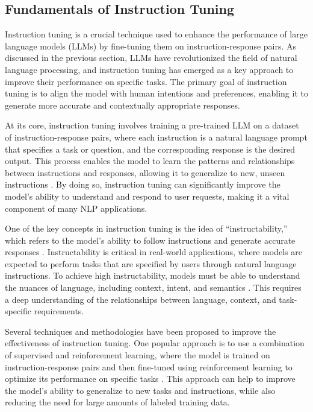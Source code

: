 \documentclass[11pt]{article}
\begin{document}
\subsection{Fundamentals of Instruction Tuning}

Instruction tuning is a crucial technique used to enhance the performance of large language models (LLMs) by fine-tuning them on instruction-response pairs. As discussed in the previous section, LLMs have revolutionized the field of natural language processing, and instruction tuning has emerged as a key approach to improve their performance on specific tasks. The primary goal of instruction tuning is to align the model with human intentions and preferences, enabling it to generate more accurate and contextually appropriate responses.

At its core, instruction tuning involves training a pre-trained LLM on a dataset of instruction-response pairs, where each instruction is a natural language prompt that specifies a task or question, and the corresponding response is the desired output. This process enables the model to learn the patterns and relationships between instructions and responses, allowing it to generalize to new, unseen instructions \cite{ref24}. By doing so, instruction tuning can significantly improve the model's ability to understand and respond to user requests, making it a vital component of many NLP applications.

One of the key concepts in instruction tuning is the idea of ``instructability,'' which refers to the model's ability to follow instructions and generate accurate responses \cite{ref5}. Instructability is critical in real-world applications, where models are expected to perform tasks that are specified by users through natural language instructions. To achieve high instructability, models must be able to understand the nuances of language, including context, intent, and semantics \cite{ref2}. This requires a deep understanding of the relationships between language, context, and task-specific requirements.

Several techniques and methodologies have been proposed to improve the effectiveness of instruction tuning. One popular approach is to use a combination of supervised and reinforcement learning, where the model is trained on instruction-response pairs and then fine-tuned using reinforcement learning to optimize its performance on specific tasks \cite{ref31}. This approach can help to improve the model's ability to generalize to new tasks and instructions, while also reducing the need for large amounts of labeled training data.
\end{document}

